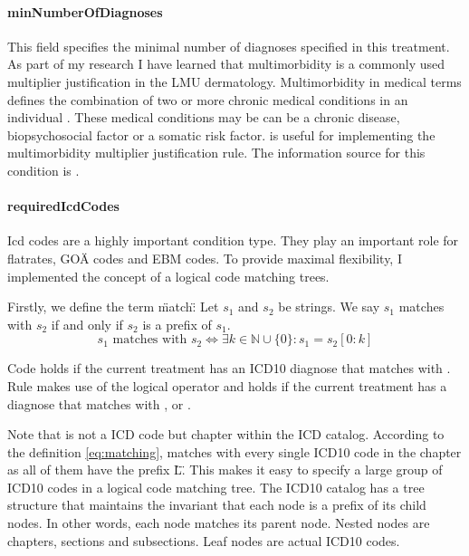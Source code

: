 \paragraph{minNumberOfDiagnoses}
This field specifies the minimal number of diagnoses specified in this treatment.
As part of my research I have learned that multimorbidity is a commonly used multiplier justification in the LMU dermatology.
Multimorbidity in medical terms defines the combination of two or more chronic medical conditions in an individual \cite{Reste2013The}.
These medical conditions may be can be a chronic disease, biopsychosocial factor or a somatic risk factor.
\minNumberOfDiagnoses is useful for implementing the multimorbidity multiplier justification rule.
The information source for this condition is .

\paragraph{requiredIcdCodes}

Icd codes are a highly important condition type.
They play an important role for flatrates, GOÄ codes and EBM codes.
To provide maximal flexibility, I implemented the concept of a logical code matching trees.



Firstly, we define the term \"match\":
Let \( s_1 \) and \( s_2 \) be strings.
We say \( s_1 \) matches with \( s_2 \) if and only if \( s_2 \) is a prefix of \( s_1 \).
\begin{equation}\label{eq:matching}
    s_1 \text{ matches with } s_2 \iff \exists k \in \mathbb{N} \cup \{0\} : s_1 = s_2[0:k]
\end{equation}

Code  holds if the current treatment has an ICD10 diagnose that matches with .
Rule  makes use of the logical  operator and holds if the current treatment has a diagnose that matches with ,  or .

Note that  is not a ICD code but chapter within the ICD catalog.
According to the definition \ref{eq:matching},  matches with every single ICD10 code in the  chapter as all of them have the prefix \"L\".
This makes it easy to specify a large group of ICD10 codes in a logical code matching tree.
The ICD10 catalog has a tree structure that maintains the invariant that each node is a prefix of its child nodes.
In other words, each node matches its parent node.
Nested nodes are chapters, sections and subsections.
Leaf nodes are actual ICD10 codes.

